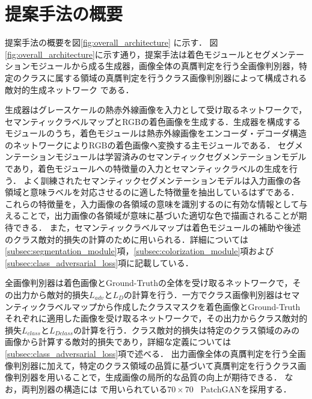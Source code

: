 \documentclass[11pt,dvipdfmx]{ujreport}
\begin{document}
\section{提案手法の概要}
\label{sec:overview}
提案手法の概要を図\ref{fig:overall_architecture} に示す．
図 \ref{fig:overall_architecture}に示す通り，提案手法は着色モジュールとセグメンテーションモジュールから成る生成器，画像全体の真贋判定を行う全画像判別器，特定のクラスに属する領域の真贋判定を行うクラス画像判別器によって構成される敵対的生成ネットワーク \cite{Goodfellow_2014_NIPS_GAN} である．\par
生成器はグレースケールの熱赤外線画像を入力として受け取るネットワークで，セマンティックラベルマップとRGBの着色画像を生成する．生成器を構成するモジュールのうち，着色モジュールは熱赤外線画像をエンコーダ・デコーダ構造のネットワークによりRGBの着色画像へ変換する主モジュールである．
セグメンテーションモジュールは学習済みのセマンティックセグメンテーションモデルであり，着色モジュールへの特徴量の入力とセマンティックラベルの生成を行う．
よく訓練されたセマンティックセグメンテーションモデルは入力画像の各領域と意味ラベルを対応させるのに適した特徴量を抽出しているはずである．
これらの特徴量を，入力画像の各領域の意味を識別するのに有効な情報として与えることで，出力画像の各領域が意味に基づいた適切な色で描画されることが期待できる．
また，セマンティックラベルマップは着色モジュールの補助や後述のクラス敵対的損失の計算のために用いられる．詳細については\ref{subsec:segmentation_module}項，\ref{subsec:colorization_module}項および\ref{subsec:class_adversarial_loss}項に記載している．\par
全画像判別器は着色画像とGround-Truthの全体を受け取るネットワークで，その出力から敵対的損失$L_{adv}$と$L_{D}$の計算を行う．一方でクラス画像判別器はセマンティックラベルマップから作成したクラスマスクを着色画像とGround-Truthそれぞれに適用した画像を受け取るネットワークで，その出力からクラス敵対的損失$L_{class}$と$L_{Dclass}$の計算を行う．クラス敵対的損失は特定のクラス領域のみの画像から計算する敵対的損失であり，詳細な定義については\ref{subsec:class_adversarial_loss}項で述べる．
出力画像全体の真贋判定を行う全画像判別器に加えて，特定のクラス領域の品質に基づいて真贋判定を行うクラス画像判別器を用いることで，生成画像の局所的な品質の向上が期待できる．
なお，両判別器の構造には \cite{Isola_2017_CVPR_pix2pix} で用いられている$70 \times 70$ \ PatchGANを採用する．
\end{document}
